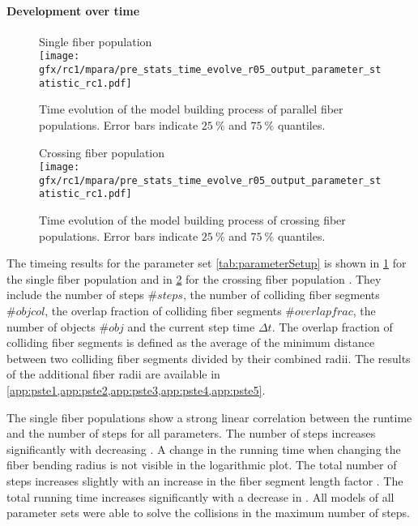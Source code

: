 \paragraph{Development over time}
%
\begin{figure}[p]
\centering
Single fiber population \pfbs{}\\[0em]
\texttt{[image: gfx/rc1/mpara/pre\_stats\_time\_evolve\_r05\_output\_parameter\_statistic\_rc1.pdf]}
\caption{Time evolution of the model building process of parallel fiber populations. Error bars indicate $\SI{25}{\percent}$ and $\SI{75}{\percent}$ quantiles.}
\label{fig:timeDevelopmentNone}
\end{figure}
%
\begin{figure}[p]
\centering
Crossing fiber population \cfbs{}\\[0ex]
\texttt{[image: gfx/rc1/mpara/pre\_stats\_time\_evolve\_r05\_output\_parameter\_statistic\_rc1.pdf]}
\caption{Time evolution of the model building process of crossing fiber populations. Error bars indicate $\SI{25}{\percent}$ and $\SI{75}{\percent}$ quantiles.}
\label{fig:timeDevelopmentCross}
\end{figure}
%
The timeing results for the parameter set \cref{tab:parameterSetup} is shown in \cref{fig:timeDevelopmentNone} for the single fiber population \pfbs{} and in \cref{fig:timeDevelopmentCross} for the crossing fiber population \cfbs{}.
They include the number of steps $\# steps$, the number of colliding fiber segments $\# objcol$, the overlap fraction of colliding fiber segments $\# overlapfrac$, the number of objects $\# obj$ and the current step time $\Delta t$.
The overlap fraction of colliding fiber segments is defined as the average of the minimum distance between two colliding fiber segments divided by their combined radii.
The results of the additional fiber radii are available in \cref{app:pste1,app:pste2,app:pste3,app:pste4,app:pste5}.
\par
%
The single fiber populations \pfbs{} show a strong linear correlation between the runtime and the number of steps for all parameters.
The number of steps increases significantly with decreasing \segLengthFactor{}.
A change in the running time when changing the fiber bending radius \segRadiusFactor{} is not visible in the logarithmic plot.
The total number of steps increases slightly with an increase in the fiber segment length factor \segLengthFactor{}.
The total running time increases significantly with a decrease in \segLengthFactor{}.
All models of all parameter sets were able to solve the collisions in the maximum number of steps.
